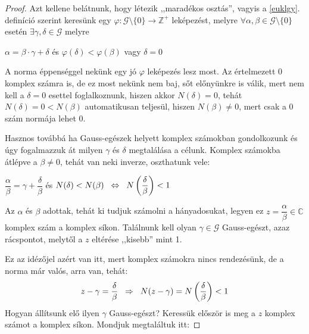 \documentclass[12pt]{book}
\theoremstyle{plain} %
\theoremstyle{definition} %
\theoremstyle{remark}
\numberwithin{equation}{section}  %
\def\Z{\mathbb{Z}}
\def\C{\mathbb{C}}
\def\G{\mathcal{G}}
\begin{document}
	\begin{proof}
		Azt kellene belátnunk, hogy létezik ,,maradékos osztás'', vagyis a \ref{euklgy}. definíció szerint keresünk egy $\varphi\colon \G\setminus \{0\} \to \Z^{+}$ leképezést, melyre $\forall \alpha, \beta\in \G\setminus \{0\}$ esetén $\exists \gamma,\delta\in \G$ melyre
		\begin{center}
			$\alpha =\beta \cdot \gamma  +\delta$ \hspace{1cm} és \hspace{1cm} $\varphi(\delta)<\varphi(\beta)$ \hspace{0.25cm} vagy \hspace{0.25cm} $\delta=0$
		\end{center}
		A norma éppenséggel nekünk egy jó $\varphi$ leképezés lesz most. Az értelmezett $0$ komplex számra is, de ez most nekünk nem baj, sőt előnyünkre is válik, mert nem kell a $\delta = 0$ esettel foglalkoznunk, hiszen akkor $N(\delta)= 0$, tehát $N(\delta)=0<N(\beta)$ automatikusan teljesül, hiszen $N(\beta)\neq 0$, mert csak a $0$ szám normája lehet $0$.
		
		Hasznos továbbá ha Gauss-egészek helyett komplex számokban gondolkozunk és úgy fogalmazzuk át milyen $\gamma$ és $\delta$ megtalálása a célunk. Komplex számokba átlépve a $\beta\neq 0$, tehát van neki inverze, oszthatunk vele:
		\begin{center}
			$\dfrac{\alpha}{\beta} = \gamma  +\dfrac{\delta}{\beta}$ \hspace{1cm} és \hspace{1cm} $N(\delta)<N(\beta) \hspace{0.2cm} \Leftrightarrow \hspace{0.2cm} N\left (\dfrac{\delta}{\beta}\right)<1$
		\end{center}
		Az $\alpha$ és $\beta$ adottak, tehát ki tudjuk számolni a hányadosukat, legyen ez $z=\dfrac{\alpha}{\beta}\in\C$ komplex szám a komplex síkon. Találnunk kell olyan $\gamma\in \G$ Gauss-egészt, azaz rácspontot, melytől a $z$ eltérése ,,kisebb'' mint 1.
		
		Ez az idézőjel azért van itt, mert komplex számokra nincs rendezésünk, de a norma már valós, arra van, tehát:
		\[ z - \gamma = \dfrac{\delta}{\beta} \hspace{0.2cm} \Rightarrow \hspace{0.2cm} N(z-\gamma) = N\left(\dfrac{\delta}{\beta}\right) < 1  \]
		Hogyan állítsunk elő ilyen $\gamma$ Gauss-egészt? Keressük először is meg a $z$ komplex számot a komplex síkon. Mondjuk megtaláltuk itt:
		

\end{proof}
\end{document}
